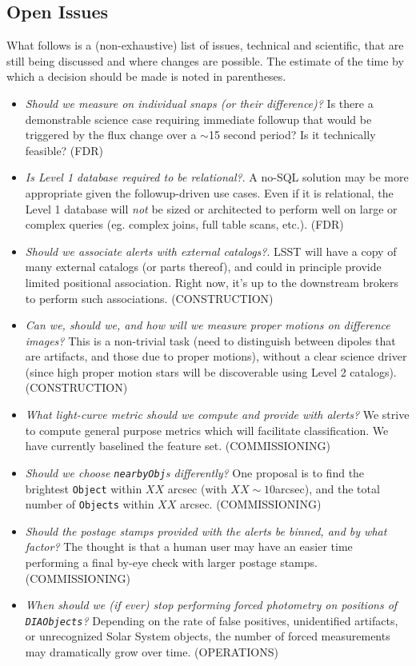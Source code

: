 \documentclass[12pt]{article}
\newcommand{\code}[1]{\texttt{#1}}
\newcommand{\DIAObjects}{\code{DIAObjects}\xspace}
\newcommand{\DB}{{Level 1 database}\xspace}
\newcommand{\Object}{\code{Object}\xspace}
\newcommand{\Objects}{\code{Objects}\xspace}
\begin{document}
\begin{openissues}
\subsection{Open Issues}

What follows is a (non-exhaustive) list of issues, technical and scientific, that are still being discussed and where changes are possible. The estimate of the time by which a decision should be made is noted in parentheses.

\begin{itemize}
    \item \emph{Should we measure on individual snaps (or their difference)?} Is there a demonstrable science case requiring immediate followup that would be triggered by the flux change over a $\sim$15 second period? Is it technically feasible? (FDR)
    \item \emph{Is \DB required to be relational?}. A no-SQL solution may be more appropriate given the followup-driven use cases. Even if it is relational, the Level 1 database will \emph{not} be sized or architected to perform well on large or complex queries (eg. complex joins, full table scans, etc.). (FDR)
    \item \emph{Should we associate alerts with external catalogs?}. LSST will have a copy of many external catalogs (or parts thereof), and could in principle provide limited positional association. Right now, it's up to the downstream brokers to perform such associations. (CONSTRUCTION)
    \item \emph{Can we, should we, and how will we measure proper motions on difference images?} This is a non-trivial task (need to distinguish between dipoles that are artifacts, and those due to proper motions), without a clear science driver (since high proper motion stars will be discoverable using Level 2 catalogs). (CONSTRUCTION)
    \item \emph{What light-curve metric should we compute and provide with alerts?} We strive to compute general purpose metrics which will facilitate classification. We have currently baselined the \citet{2011ApJ...733...10R} feature set. (COMMISSIONING)
    \item \emph{Should we choose \texttt{nearbyObj}s differently?} One proposal is to find the brightest \Object within $XX$ arcsec (with $XX \sim 10$arcsec), and the total number of \Objects within $XX$ arcsec. (COMMISSIONING)
    \item \emph{Should the postage stamps provided with the alerts be binned, and by what factor?} The thought is that a human user may have an easier time performing a final by-eye check with larger postage stamps. (COMMISSIONING)
    \item \emph{When should we (if ever) stop performing forced photometry on positions of \DIAObjects?} Depending on the rate of false positives, unidentified artifacts, or unrecognized Solar System objects, the number of forced measurements may dramatically grow over time. (OPERATIONS)

\end{itemize}
\end{openissues}
\end{document}
